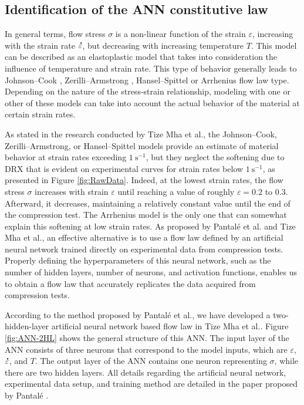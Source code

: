 \documentclass[metals,article,submit,pdftex,moreauthors]{Definitions/mdpi}
\makeatletter
\DeclareRobustCommand{\mdot}[1]{\accentset{\mbox{\bfseries .}}{#1}}
\DeclareRobustCommand{\eal}{et al.\@\xspace}
\DeclareRobustCommand{\ps}{\text{s}^{-1}}
\makeatother
\begin{document}
\subsection{Identification of the ANN constitutive law\label{subsec:ANNConstitutiveLaw}}

In general terms, flow stress $\sigma$ is a non-linear function of the strain $\varepsilon$, increasing with the strain rate $\mdot\varepsilon$, but decreasing with increasing temperature $T$.
This model can be described as an elastoplastic model that takes into consideration the influence of temperature and strain rate.
This type of behavior generally leads to Johnson--Cook \cite{Johnson-1983}, Zerilli--Armstrong \cite{Zerilli-1987}, Hansel--Spittel \cite{Hensel-1978} or Arrhenius \cite{Sellars-1966} flow law type.
Depending on the nature of the stress-strain relationship, modeling with one or other of these models can take into account the actual behavior of the material at certain strain rates.

As stated in the research conducted by Tize Mha \eal \cite{TizeMha-2023}, the Johnson--Cook, Zerilli--Armstrong, or Hansel--Spittel models provide an estimate of material behavior at strain rates exceeding $1~\ps$, but they neglect the softening due to DRX that is evident on experimental curves for strain rates below $1~\ps$, as presented in Figure \ref{fig:RawData}.
Indeed, at the lowest strain rates, the flow stress $\sigma$ increases with strain $\varepsilon$ until reaching a value of roughly $\varepsilon=0.2$ to $0.3$.
Afterward, it decreases, maintaining a relatively constant value until the end of the compression test.
The Arrhenius model is the only one that can somewhat explain this softening at low strain rates.
As proposed by Pantalé \eal \cite{Pantale-2021, Pantale-2023} and Tize Mha \eal \cite{TizeMha-2023}, an effective alternative is to use a flow law defined by an artificial neural network trained directly on experimental data from compression tests.
Properly defining the hyperparameters of this neural network, such as the number of hidden layers, number of neurons, and activation functions, enables us to obtain a flow law that accurately replicates the data acquired from compression tests.

According to the method proposed by Pantalé \eal \cite{Pantale-2021, Pantale-2023}, we have developed a two-hidden-layer artificial neural network based flow law in Tize Mha \eal \cite{TizeMha-2023}.
Figure \ref{fig:ANN-2HL} shows the general structure of this ANN.
The input layer of the ANN consists of three neurons that correspond to the model inputs, which are $\varepsilon$, $\mdot\varepsilon$, and $T$.
The output layer of the ANN contains one neuron representing $\sigma$, while there are two hidden layers.
All details regarding the artificial neural network, experimental data setup, and training method are detailed in the paper proposed by Pantalé \cite{Pantale-2023}.
\end{document}
